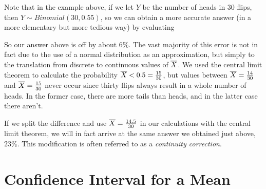 \par
Note that in the example above, if we let $Y$ be the number of heads in 30 flips, then $Y \sim Binomial(30,0.55)$, so we can obtain a more accurate answer (in a more elementary but more tedious way) by evaluating
\par
So our answer above is off by about $6\%$. The vast majority of this error is not in fact due to the use of a normal distribution as an approximation, but simply to the translation from discrete to continuous values of ${\overline{X}}$. We used the central limit theorem to calculate the probability ${\overline{X}} < 0.5 = \frac{15}{30}$, but values between ${\overline{X}} = \frac{14}{30}$ and ${\overline{X}} = \frac{15}{30}$ never occur since thirty flips always result in a whole number of heads. In the former case, there are more tails than heads, and in the latter case there aren't.
\par
If we split the difference and use ${\overline{X}} = \frac{14.5}{30}$ in our calculations with the central limit theorem, we will in fact arrive at the same answer we obtained just above, $23\%$. This modification is often referred to as a \emph{continuity correction}.

\section{Confidence Interval for a Mean}\label{ConfIntervalMeanSec}


